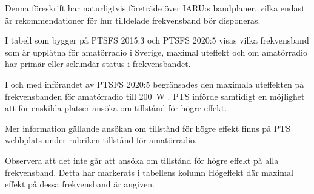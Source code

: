 Denna föreskrift har naturligtvis företräde över IARU:s bandplaner, vilka
endast är rekommendationer för hur tilldelade frekvensband bör disponeras.

I tabell  som bygger på PTSFS 2015:3 och PTSFS 2020:5 visas
vilka frekvensband som är upplåtna för amatörradio i Sverige, maximal uteffekt
och om amatörradio har primär eller sekundär status i frekvensbandet.

I och med införandet av PTSFS 2020:5 begränsades den maximala uteffekten på
frekvensbanden för amatörradio till \SI{200}{\watt} \pep.
PTS införde samtidigt en möjlighet att för enskilda platser ansöka om tillstånd
för högre effekt.

Mer information gällande ansökan om tillstånd för högre effekt finns på PTS
webbplats under rubriken tillstånd för amatörradio.

Observera att det inte går att ansöka om tillstånd för högre effekt på alla
frekvensband. Detta har markerats i tabellens kolumn Högeffekt där maximal
effekt på dessa frekvensband är angiven.

